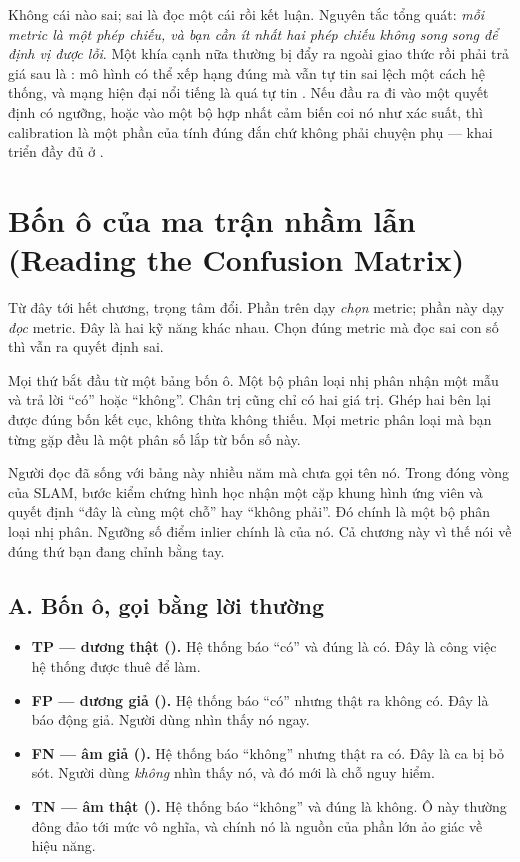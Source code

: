 \documentclass[../../deep_learning.tex]{subfiles}
\begin{document}
Không cái nào sai; sai là đọc một cái rồi kết luận. Nguyên tắc tổng quát: \emph{mỗi metric là một phép chiếu, và bạn cần ít nhất hai phép chiếu không song song để định vị được lỗi}.
 Một khía cạnh nữa thường bị đẩy ra ngoài giao thức rồi phải trả giá sau là : mô hình có thể xếp hạng đúng mà vẫn tự tin sai lệch một cách hệ thống, và mạng hiện đại nổi tiếng là quá tự tin \cite{guo2017calibration}. Nếu đầu ra đi vào một quyết định có ngưỡng, hoặc vào một bộ hợp nhất cảm biến coi nó như xác suất, thì calibration là một phần của tính đúng đắn chứ không phải chuyện phụ --- khai triển đầy đủ ở .

\section{Bốn ô của ma trận nhầm lẫn (Reading the Confusion Matrix)}
Từ đây tới hết chương, trọng tâm đổi. Phần trên dạy \emph{chọn} metric; phần này dạy \emph{đọc} metric. Đây là hai kỹ năng khác nhau. Chọn đúng metric mà đọc sai con số thì vẫn ra quyết định sai.

Mọi thứ bắt đầu từ một bảng bốn ô. Một bộ phân loại nhị phân nhận một mẫu và trả lời ``có'' hoặc ``không''. Chân trị cũng chỉ có hai giá trị. Ghép hai bên lại được đúng bốn kết cục, không thừa không thiếu. Mọi metric phân loại mà bạn từng gặp đều là một phân số lắp từ bốn số này.

Người đọc đã sống với bảng này nhiều năm mà chưa gọi tên nó. Trong đóng vòng của SLAM, bước kiểm chứng hình học nhận một cặp khung hình ứng viên và quyết định ``đây là cùng một chỗ'' hay ``không phải''. Đó chính là một bộ phân loại nhị phân. Ngưỡng số điểm inlier chính là  của nó. Cả chương này vì thế nói về đúng thứ bạn đang chỉnh bằng tay.

\subsection{A. Bốn ô, gọi bằng lời thường}
\begin{itemize}
\item \textbf{TP --- dương thật ().} Hệ thống báo ``có'' và đúng là có. Đây là công việc hệ thống được thuê để làm.
\item \textbf{FP --- dương giả ().} Hệ thống báo ``có'' nhưng thật ra không có. Đây là báo động giả. Người dùng nhìn thấy nó ngay.
\item \textbf{FN --- âm giả ().} Hệ thống báo ``không'' nhưng thật ra có. Đây là ca bị bỏ sót. Người dùng \emph{không} nhìn thấy nó, và đó mới là chỗ nguy hiểm.
\item \textbf{TN --- âm thật ().} Hệ thống báo ``không'' và đúng là không. Ô này thường đông đảo tới mức vô nghĩa, và chính nó là nguồn của phần lớn ảo giác về hiệu năng.
\end{itemize}
\end{document}
